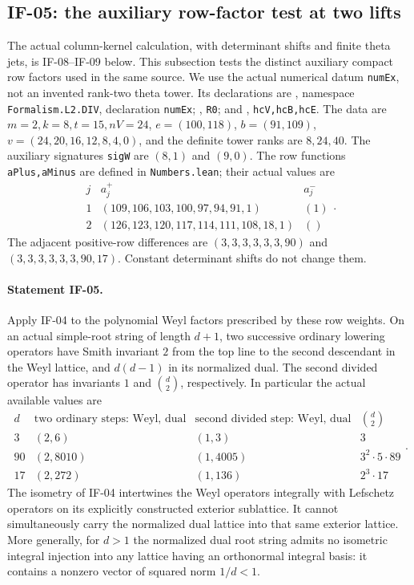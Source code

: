 \documentclass[11pt,a4paper]{article}
\theoremstyle{definition}
\theoremstyle{remark}
\begin{document}
\subsection{IF-05: the auxiliary row-factor test at two lifts}
The actual column-kernel calculation, with determinant shifts and
finite theta jets, is IF-08--IF-09 below. This subsection tests the
distinct auxiliary compact row factors used in the same source.
We use the actual numerical datum \texttt{numEx}, not an invented
rank-two theta tower. Its declarations are
, namespace
\texttt{Formalism.L2.DIV}, declaration \texttt{numEx};
,
\texttt{R0}; and
, \texttt{hcV,hcB,hcE}.
The data are $m=2,k=8,t=15,nV=24$, $e=(100,118)$, $b=(91,109)$,
$v=(24,20,16,12,8,4,0)$, and the definite tower ranks are $8,24,40$.
The auxiliary signatures \texttt{sigW} are $(8,1)$ and $(9,0)$.
The row functions \texttt{aPlus,aMinus} are defined in
\texttt{Numbers.lean}; their actual values are
\[
\begin{array}{c|l|l}
 j&a_j^+&a_j^-\\\hline
 1&(109,106,103,100,97,94,91,1)&(1)\\
 2&(126,123,120,117,114,111,108,18,1)&()
\end{array}.
\]
The adjacent positive-row differences are
$(3,3,3,3,3,3,90)$ and $(3,3,3,3,3,3,90,17)$.
Constant determinant shifts do not change them.

\paragraph{Statement IF-05.}
Apply IF-04 to the polynomial Weyl factors prescribed by these row
weights. On an actual simple-root string of length $d+1$, two successive
ordinary lowering operators have Smith invariant $2$ from the top line
to the second descendant in the Weyl lattice, and $d(d-1)$ in its
normalized dual. The second divided operator has invariants $1$ and
$\binom d2$, respectively. In particular the actual available values are
\[
\begin{array}{c|c|c|c}
 d&\text{two ordinary steps: Weyl, dual}
   &\text{second divided step: Weyl, dual}&\binom d2\\\hline
 3&(2,6)&(1,3)&3\\
 90&(2,8010)&(1,4005)&3^2\cdot5\cdot89\\
 17&(2,272)&(1,136)&2^3\cdot17
\end{array}.                                                   \tag{IF-05a}
\]
The isometry of IF-04 intertwines the Weyl operators integrally with
Lefschetz operators on its explicitly constructed exterior sublattice.
It cannot simultaneously carry the normalized dual lattice into that
same exterior lattice. More generally, for $d>1$ the normalized dual
root string admits no isometric integral injection into any lattice
having an orthonormal integral basis: it contains a nonzero vector of
squared norm $1/d<1$.
\end{document}
